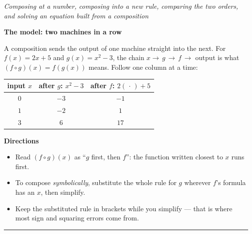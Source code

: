 \documentclass[12pt]{article}
\begin{document}

\begin{center}
\textit{Composing at a number, composing into a new rule, comparing the two orders, and solving an equation built from a composition}
\end{center}

\noindent\textbf{The model: two machines in a row}

\noindent A composition sends the output of one machine straight into the next.
For $f(x) = 2x+5$ and $g(x) = x^2-3$, the chain
$x \rightarrow \boxed{\,g\,} \rightarrow \boxed{\,f\,} \rightarrow$ output is
what $(f \circ g)(x) = f(g(x))$ means. Follow one column at a time:

\begin{center}
\begin{tabular}{|c|c|c|}
\hline
\textbf{input $x$} & \textbf{after $g$:\; $x^2-3$} & \textbf{after $f$:\; $2(\,\cdot\,)+5$} \\
\hline
$0$ & $-3$ & $-1$ \\
\hline
$1$ & $-2$ & $1$ \\
\hline
$3$ & $6$ & $17$ \\
\hline
\end{tabular}
\end{center}

\noindent\textbf{Directions}
\begin{itemize}[leftmargin=1.1cm, itemsep=1pt, topsep=3pt]
  \item Read $(f \circ g)(x)$ as ``$g$ first, then $f$'': the function written closest to $x$ runs first.
  \item To compose \emph{symbolically}, substitute the whole rule for $g$ wherever $f$'s formula has an $x$, then simplify.
  \item Keep the substituted rule in brackets while you simplify --- that is where most sign and squaring errors come from.
\end{itemize}

\vspace{0.2cm}
\noindent\rule{\linewidth}{0.4pt}

\end{document}
